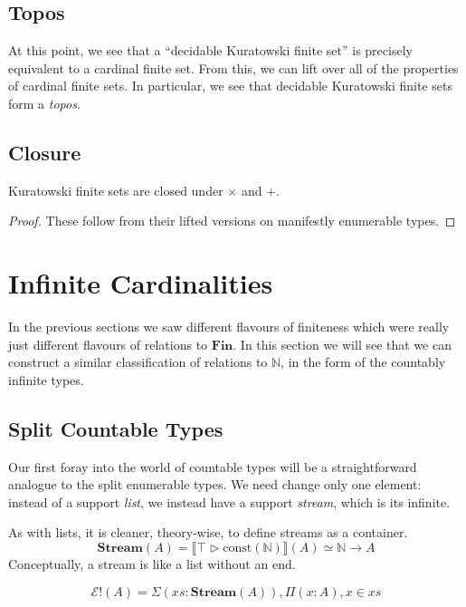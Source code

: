 \subsection{Topos}
At this point, we see that a ``decidable Kuratowski finite set'' is precisely
equivalent to a cardinal finite set.
From this, we can lift over all of the properties of cardinal finite sets.
In particular, we see that decidable Kuratowski finite sets form a \emph{topos}.
\subsection{Closure}
\begin{rm-theorem}
  Kuratowski finite sets are closed under \(\times\) and \(+\).
\end{rm-theorem}
\begin{proof}
  These follow from their lifted versions on manifestly enumerable types.
\end{proof}
\section{Infinite Cardinalities} \label{infinite-cardinalities}
In the previous sections we saw different flavours of finiteness which were
really just different flavours of relations to \(\mathbf{Fin}\).
In this section we will see that we can construct a similar classification of
relations to \(\mathbb{N}\), in the form of the countably infinite types.
\subsection{Split Countable Types}
Our first foray into the world of countable types will be a straightforward
analogue to the split enumerable types.
We need change only one element: instead of a support \emph{list}, we instead
have a support \emph{stream}, which is its infinite.
\begin{rm-definition}[Stream]
  As with lists, it is cleaner, theory-wise, to define streams as a container.
  \begin{equation}
    \mathbf{Stream}(A) = \llbracket \top \triangleright \text{const} (\mathbb{N}) \rrbracket(A) \simeq \mathbb{N} \rightarrow A
  \end{equation}
  Conceptually, a stream is like a list without an end.
\end{rm-definition}
\begin{rm-definition}
  \begin{equation}
    \mathcal{E}!(A) = \Sigma {(\mathit{xs} : \mathbf{Stream}(A))} , \Pi {(x : A)} , x \in \mathit{xs}
  \end{equation}
\end{rm-definition}
